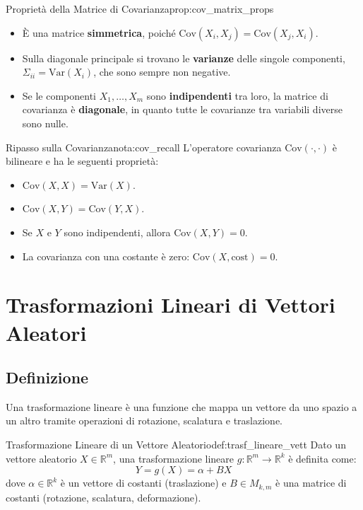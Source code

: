 \begin{proposizione}{Proprietà della Matrice di Covarianza}{prop:cov_matrix_props}
\begin{itemize}
    \item È una matrice \textbf{simmetrica}, poiché \(\text{Cov}(X_i, X_j) = \text{Cov}(X_j, X_i)\).
    \item Sulla diagonale principale si trovano le \textbf{varianze} delle singole componenti, \(\Sigma_{ii} = \text{Var}(X_i)\), che sono sempre non negative.
    \item Se le componenti \(X_1, \dots, X_m\) sono \textbf{indipendenti} tra loro, la matrice di covarianza è \textbf{diagonale}, in quanto tutte le covarianze tra variabili diverse sono nulle.
\end{itemize}
\end{proposizione}

\begin{nota}{Ripasso sulla Covarianza}{nota:cov_recall}
L'operatore covarianza \(\text{Cov}(\cdot, \cdot)\) è bilineare e ha le seguenti proprietà:
\begin{itemize}
    \item \(\text{Cov}(X, X) = \text{Var}(X)\).
    \item \(\text{Cov}(X, Y) = \text{Cov}(Y, X)\).
    \item Se \(X\) e \(Y\) sono indipendenti, allora \(\text{Cov}(X, Y) = 0\).
    \item La covarianza con una costante è zero: \(\text{Cov}(X, \text{cost}) = 0\).
\end{itemize}
\end{nota}

\section{Trasformazioni Lineari di Vettori Aleatori}\label{sec:trasf_lineari_va}

\subsection{Definizione}
Una trasformazione lineare è una funzione che mappa un vettore da uno spazio a un altro tramite operazioni di rotazione, scalatura e traslazione.

\begin{definizione}{Trasformazione Lineare di un Vettore Aleatorio}{def:trasf_lineare_vett}
Dato un vettore aleatorio \(X \in \mathbb{R}^m\), una trasformazione lineare \(g: \mathbb{R}^m \to \mathbb{R}^k\) è definita come:
\[
Y = g(X) = \alpha + BX
\]
dove \(\alpha \in \mathbb{R}^k\) è un vettore di costanti (traslazione) e \(B \in M_{k,m}\) è una matrice di costanti (rotazione, scalatura, deformazione).
\end{definizione}

